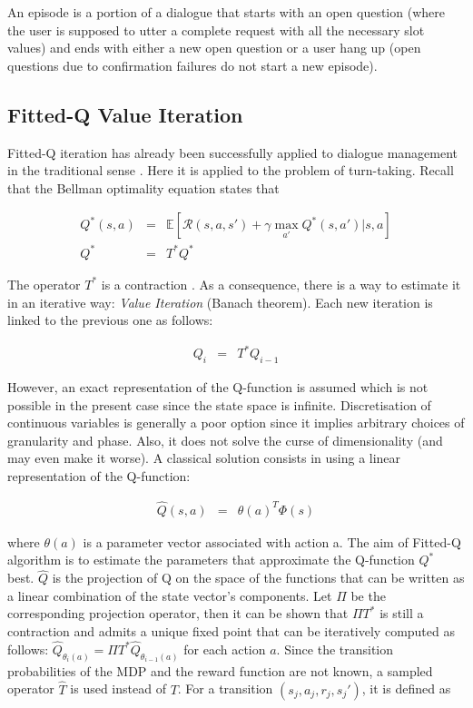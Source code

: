         An episode is a portion of a dialogue that starts with an open question (where the user is supposed to utter a complete request with all the necessary slot values) and ends with either a new open question or a user hang up (open questions due to confirmation failures do not start a new episode).
            
	\subsection{Fitted-Q Value Iteration}
    
    	Fitted-Q iteration has already been successfully applied to dialogue management in the traditional sense \cite{Chandramohan2010}. Here it is applied to the problem of turn-taking. Recall that the Bellman optimality equation states that
			
			\begin{eqnarray}
				Q^*(s,a) & = & \mathbb{E}[\mathscr{R} (s,a,s') + \gamma \max_{a'} Q^*(s,a') | s, a] \\
				Q^* & = & T^* Q^*
			\end{eqnarray}
			
				The operator $T^*$ is a contraction \cite{Bellman1957}. As a consequence, there is a way to estimate it in an iterative way: \textit{Value Iteration} (Banach theorem). Each new iteration is linked to the previous one as follows:
        
			\begin{eqnarray}
				Q_i & = & T^* Q_{i-1}
			\end{eqnarray}
						
					However, an exact representation of the Q-function is assumed which is not possible in the present case since the state space is infinite. Discretisation of continuous variables is generally a poor option since it implies arbitrary choices of granularity and phase. Also, it does not solve the curse of dimensionality (and may even make it worse). A classical solution consists in using a linear representation of the Q-function:
        
			\begin{eqnarray}
				\hat{Q}(s,a) & = & \theta(a)^T \Phi(s)
			\end{eqnarray}
            
      	where $\theta(a)$ is a parameter vector associated with action a. The aim of Fitted-Q algorithm is to estimate the parameters that approximate the Q-function $Q^*$ best. $\hat{Q}$ is the projection of Q on the space of the functions that can be written as a linear combination of the state vector's components. Let $\Pi$ be the corresponding projection operator, then it can be shown that $\Pi T^*$ is still a contraction and admits a unique fixed point that can be iteratively computed as follows: $\hat{Q}_{\theta_i (a)} = \Pi T^* \hat{Q}_{\theta_{i-1} (a)}$ for each action $a$. Since the transition probabilities of the MDP and the reward function are not known, a sampled operator $\hat{T}$ is used instead of $T$. For a transition $(s_j,a_j,r_j,s_j')$, it is defined as
        
